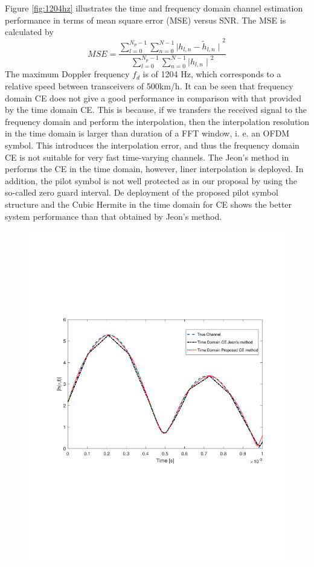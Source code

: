 \documentclass[12pt,journal,draftclsnofoot,onecolumn]{IEEEtran}
\begin{document}
{{{Figure \ref{fig:1204hz} illustrates the time and frequency domain channel estimation performance in terms of mean square error (MSE) versus SNR. The MSE is calculated by
%
\begin{equation}\label{eq:mse-calculate}
MSE=\dfrac{\sum_{l=0}^{N_p-1}\sum_{n=0}^{N-1} {\mid h_{l,n} - \tilde{h}_{l,n}\mid}^{2} }{{\sum_{l=0}^{N_p-1}\sum_{n=0}^{N-1} {\mid h_{l,n}\mid}^{2}}}
\end{equation}
%
The maximum Doppler frequency $f_{d}$ is of 1204 Hz, which corresponds to a relative speed between transceivers of 500km/h. It can be seen that frequency domain CE does not give a good performance in comparison with that provided by the time domain CE. This is because, if we transfers the received signal to the frequency domain and perform the interpolation, then the interpolation resolution in the time domain is larger than duration of a FFT window, i. e. an OFDM symbol. This introduces the interpolation error, and thus the frequency domain CE is not suitable for very fast time-varying channels. The Jeon's method in \cite{Jeon1999} performs the CE in the time domain, however, liner interpolation is deployed. In addition, the pilot symbol is not well protected as in our proposal by using the so-called zero guard interval. De deployment of the proposed pilot symbol structure and the Cubic Hermite in the time domain for CE shows the better system performance than that obtained by Jeon's method.  
%
\begin{figure}
	\centering
	\includegraphics[width=1.0\linewidth]{figures/compare_linear_cubic_org.pdf}

\end{figure}}}}
\end{document}
